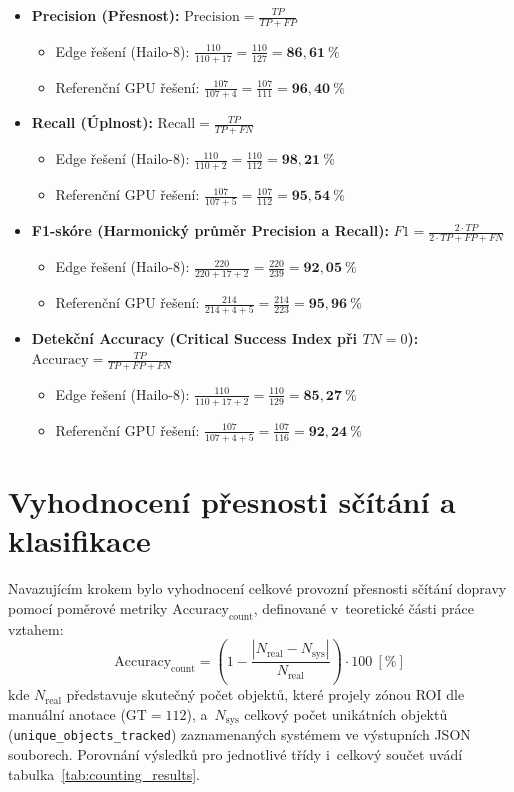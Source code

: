 \begin{itemize}
    \item \textbf{Precision (Přesnost):} $\text{Precision} = \frac{TP}{TP + FP}$
    \begin{itemize}
        \item Edge řešení (Hailo-8): $\frac{110}{110 + 17} = \frac{110}{127} = \mathbf{86{,}61~\%}$
        \item Referenční GPU řešení: $\frac{107}{107 + 4} = \frac{107}{111} = \mathbf{96{,}40~\%}$
    \end{itemize}
    \item \textbf{Recall (Úplnost):} $\text{Recall} = \frac{TP}{TP + FN}$
    \begin{itemize}
        \item Edge řešení (Hailo-8): $\frac{110}{110 + 2} = \frac{110}{112} = \mathbf{98{,}21~\%}$
        \item Referenční GPU řešení: $\frac{107}{107 + 5} = \frac{107}{112} = \mathbf{95{,}54~\%}$
    \end{itemize}
    \item \textbf{F1-skóre (Harmonický průměr Precision a Recall):} $F1 = \frac{2 \cdot TP}{2 \cdot TP + FP + FN}$
    \begin{itemize}
        \item Edge řešení (Hailo-8): $\frac{220}{220 + 17 + 2} = \frac{220}{239} = \mathbf{92{,}05~\%}$
        \item Referenční GPU řešení: $\frac{214}{214 + 4 + 5} = \frac{214}{223} = \mathbf{95{,}96~\%}$
    \end{itemize}
    \item \textbf{Detekční Accuracy (Critical Success Index při $TN = 0$):} $\text{Accuracy} = \frac{TP}{TP + FP + FN}$
    \begin{itemize}
        \item Edge řešení (Hailo-8): $\frac{110}{110 + 17 + 2} = \frac{110}{129} = \mathbf{85{,}27~\%}$
        \item Referenční GPU řešení: $\frac{107}{107 + 4 + 5} = \frac{107}{116} = \mathbf{92{,}24~\%}$
    \end{itemize}
\end{itemize}

\section{Vyhodnocení přesnosti sčítání a klasifikace}
Navazujícím krokem bylo vyhodnocení celkové provozní přesnosti sčítání dopravy pomocí poměrové metriky $\text{Accuracy}_{\text{count}}$, definované v~teoretické části práce vztahem:
$$\text{Accuracy}_{\text{count}} = \left(1 - \frac{|N_{\text{real}} - N_{\text{sys}}|}{N_{\text{real}}}\right) \cdot 100~[\%]$$
kde $N_{\text{real}}$ představuje skutečný počet objektů, které projely zónou ROI dle manuální anotace ($\text{GT} = 112$), a~$N_{\text{sys}}$ celkový počet unikátních objektů (\texttt{unique\_objects\_tracked}) zaznamenaných systémem ve výstupních JSON souborech. Porovnání výsledků pro jednotlivé třídy i~celkový součet uvádí tabulka~\ref{tab:counting_results}.


